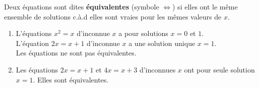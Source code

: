 \documentclass[main.tex]{subfiles}
\begin{document}
\begin{definition}
	Deux équations sont dites \textbf{équivalentes} (symbole $\iff$) si elles ont le même ensemble de solutions c.à.d elles sont vraies pour les mêmes valeurs de $x$.
\end{definition} 
\begin{example}\hfill 
	\begin{enumerate}[label=\alph*),leftmargin=*]
		\item L'équations $x^2=x$ d'inconnue $x$ a pour solutions $x=0$ et $1$.\\
		L'équation $2x=x+1$ d'inconnue $x$ a une solution unique $x=1$.\\
		Les équations ne sont pas équivalentes.
		\item Les équations $2x=x+1$ et $4x=x+3$ d'inconnues $x$ ont pour seule solution  $x=1$. Elles sont équivalentes.
	\end{enumerate}
\end{example}
%	
%	

%	
%	
\end{document}
